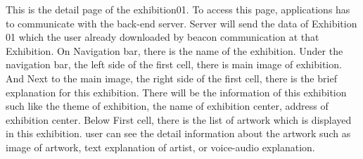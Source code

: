 \documentclass[conference]{IEEEtran}
\begin{document}
This is the detail page of the exhibition01. To access this page, applications has to communicate with the back-end server. Server will send the data of Exhibition 01 which the user already downloaded by beacon communication at that Exhibition. On Navigation bar, there is the name of the exhibition. Under the navigation bar, the left side of the first cell,  there is main image of exhibition. And Next to the main image, the right side of the first cell, there is the brief explanation for this exhibition. There will be the information of this exhibition such like the theme of exhibition, the name of exhibition center, address of exhibition center. Below First cell, there is the list of artwork which is displayed in this exhibition.  user can see the detail information about the artwork such as image of artwork, text explanation of artist, or voice-audio explanation. \\\\\\
\end{document}
